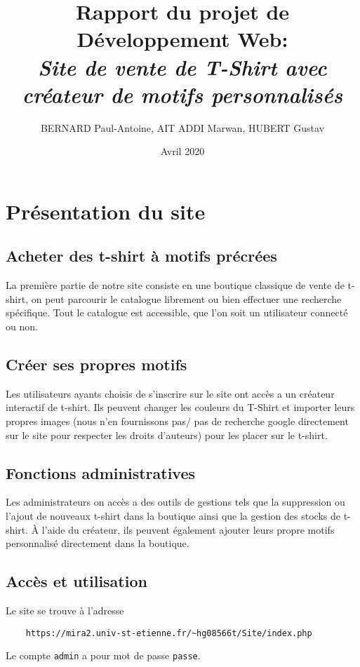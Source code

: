 \documentclass[french]{article}
\title{
  \textbf{Rapport du projet de D\'{e}veloppement Web:} \\
  \large\itshape Site de vente de T-Shirt avec créateur de motifs personnalisés}
\author{BERNARD Paul-Antoine, AIT ADDI Marwan, HUBERT Gustav }
\date{Avril 2020}
\begin{document}
\maketitle

\tableofcontents
\newpage

\setlength{\parskip}{1em}

\section{Pr\'{e}sentation du site}

\subsection{Acheter des t-shirt \`{a} motifs pr\'{e}cr\'{e}es}
La première partie de notre site consiste en une boutique classique de vente de t-shirt, on peut parcourir le catalogue librement ou bien effectuer une recherche spécifique. Tout le catalogue est accessible, que l'on soit un utilisateur connecté ou non.

\subsection{Cr\'{e}er ses propres motifs}
Les utilisateurs ayants choisis de s'inscrire sur le site ont accès a un créateur interactif de t-shirt. Ils peuvent changer les couleurs du T-Shirt et importer leurs propres images (nous n'en fournissons pas/ pas de recherche google directement sur le site pour respecter les droits d'auteurs) pour les placer sur le t-shirt.

\subsection{Fonctions administratives}
Les administrateurs on accès a des outils de gestions tels que la suppression ou l'ajout de nouveaux t-shirt dans la boutique ainsi que la gestion des stocks de t-shirt. \`{A} l'aide du cr\'{e}ateur, ils peuvent \'{e}galement ajouter leurs propre motifs personnalis\'{e} directement dans la boutique.

\subsection{Acc\`{e}s et utilisation}

\noindent Le site se trouve \`{a} l'adresse
\begin{verbatim}
    https://mira2.univ-st-etienne.fr/~hg08566t/Site/index.php
\end{verbatim}
Le compte \verb|admin| a pour mot de passe \verb|passe|.
\end{document}
